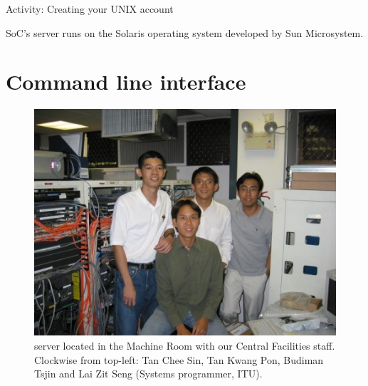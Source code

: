 \begin{frame}{Activity: Creating your UNIX account}
\end{frame}


SoC's  server runs on the Solaris operating system developed by Sun
Microsystem.  


\section{Command line interface} %

\begin{frame}
\begin{figure}
\begin{center}
\includegraphics[scale=0.5]{machine_room}
\caption{ server located in the Machine Room with our Central
Facilities staff. Clockwise from top-left: Tan Chee Sin, Tan Kwang Pon, Budiman
Tsjin and Lai Zit Seng (Systems programmer, ITU).}
\label{fig:sunfire}
\end{center}
\end{figure}
\end{frame}

